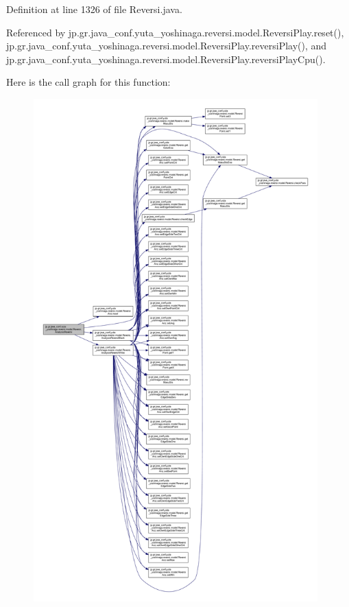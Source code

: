 Definition at line 1326 of file Reversi.\+java.



Referenced by jp.\+gr.\+java\+\_\+conf.\+yuta\+\_\+yoshinaga.\+reversi.\+model.\+Reversi\+Play.\+reset(), jp.\+gr.\+java\+\_\+conf.\+yuta\+\_\+yoshinaga.\+reversi.\+model.\+Reversi\+Play.\+reversi\+Play(), and jp.\+gr.\+java\+\_\+conf.\+yuta\+\_\+yoshinaga.\+reversi.\+model.\+Reversi\+Play.\+reversi\+Play\+Cpu().

Here is the call graph for this function\+:
\nopagebreak
\begin{figure}[H]
\begin{center}
\leavevmode
\includegraphics[height=550pt]{classjp_1_1gr_1_1java__conf_1_1yuta__yoshinaga_1_1reversi_1_1model_1_1_reversi_a43098c043d0424bb5e5e60db358a324d_cgraph}
\end{center}
\end{figure}
